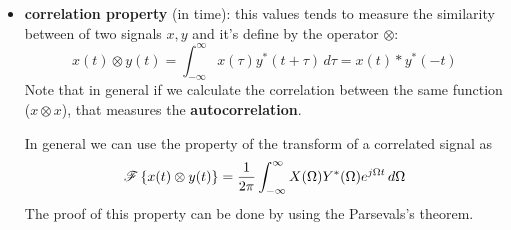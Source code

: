\begin{itemize}
		This is important because when we analyse a signal, we are analysing only one portion (in time) of the signal itself, we never can scan the full length of the signal. Analytically speaking analysing the signal $x(t)$ in a certain range $T$ can be seen as the product of the full $x$ signal with a rectangle signal $w$ with value 1 in the sampling range and 0 elsewhere. In a practical way this means that by analysing only a set of the signal $x$ (and not the full one), we introduce a distortion (due to $w$) that can be \textit{measured} with the convolution operation.
		
		\begin{proof}
		\begin{align*}
			\sum_{n=-\infty}^\infty x(n) w(n) e^{-j\omega n} & = \sum_{n=-\infty}^\infty w(n) \left( \frac 1 {2\pi} \int_{-\pi}^\pi x\big(e^{j\theta}\big) e^{j\theta n} \, d\theta \right) e^{-j\omega n} \\
			& = \frac 1 {2\pi} \int_{-\pi}^\pi \left( X\big(e^{j\theta}\big) e^{j\theta n} \sum_{n=-\infty}^\infty w(n) e^{-j\omega n} \right) \, d\theta \\
			& = \frac 1 {2\pi} \int_{-\pi}^\pi \left( X\big(e^{j\theta}\big)  \sum_{n=-\infty}^\infty w(n) e^{-j(\omega-\theta) n} \right) \, d\theta \\
			& = \frac 1 {2\pi} \int_{-\pi}^\pi X\big(e^{j\theta}\big) W \big(e^{j(\omega - \theta)}\big) \, d\theta
		\end{align*}
		\end{proof}
		An important corollary to this property is the \textbf{Parsevals's theorem} that states that given two signals $x,y$, than it happens that
		\[ \four{\int_{-\infty}^\infty x(t) y^* (t)\, dt} = \frac 1 {2\pi} \int_{-\infty} ^\infty X(\Omega) Y^*(\Omega)\, d\Omega \]
		This is useful because if we calculate $\int_{-\infty}^\infty x(t)x(t)\, dt$ we get that the energy of the signal can be calculated also in the frequency domain.
		
		\item \textbf{correlation property} (in time): this values tends to measure the similarity between of two signals $x,y$ and it's define by the operator $\otimes$:
		\[ x(t) \otimes y(t) = \int_{-\infty}^\infty x(\tau) y^*(t+\tau)\, d\tau = x(t)*y^*(-t) \]
		Note that in general if we calculate the correlation between the same function ($x\otimes x$), that measures the \textbf{autocorrelation}.
		
		In general we can use the property of the transform of a correlated signal as
		\[ \mathscr{F}\left\{ x(t)\otimes y(t) \right\} = \frac 1{2\pi} \int_{-\infty}^\infty X(\Omega) Y^*(\Omega) e^{j\Omega t} \, d\Omega  \]
		The proof of this property can be done by using the Parsevals's theorem.
	\end{itemize}
	
